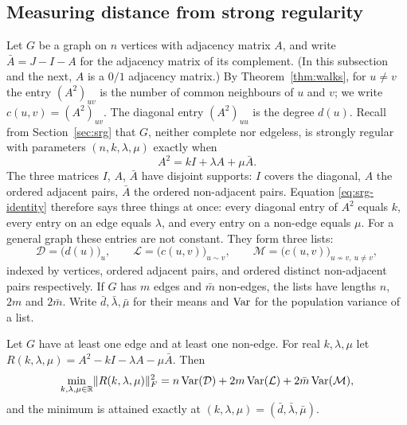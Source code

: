 \subsection{Measuring distance from strong regularity}
\label{subsec:delta}

Let $G$ be a graph on $n$ vertices with adjacency matrix $A$, and write
$\bar A=J-I-A$ for the adjacency matrix of its complement. (In this subsection
and the next, $A$ is a $0/1$ adjacency matrix.) By Theorem~\ref{thm:walks},
for $u\ne v$ the entry $(A^2)_{uv}$ is the number of common neighbours of $u$
and $v$; we write $c(u,v)=(A^2)_{uv}$. The diagonal entry $(A^2)_{uu}$ is the
degree $d(u)$. Recall from Section~\ref{sec:srg} that $G$, neither complete nor
edgeless, is strongly regular with parameters $(n,k,\lambda,\mu)$ exactly when
\begin{equation}\label{eq:srg-identity}
  A^2=kI+\lambda A+\mu\bar A .
\end{equation}
The three matrices $I$, $A$, $\bar A$ have disjoint supports: $I$ covers the
diagonal, $A$ the ordered adjacent pairs, $\bar A$ the ordered non-adjacent
pairs. Equation \eqref{eq:srg-identity} therefore says three things at once:
every diagonal entry of $A^2$ equals $k$, every entry on an edge equals
$\lambda$, and every entry on a non-edge equals $\mu$. For a general graph
these entries are not constant. They form three lists:
\begin{equation}\label{eq:three-lists}
  \mathcal D=\bigl(d(u)\bigr)_{u},\qquad
  \mathcal L=\bigl(c(u,v)\bigr)_{u\sim v},\qquad
  \mathcal M=\bigl(c(u,v)\bigr)_{u\not\sim v,\,u\ne v},
\end{equation}
indexed by vertices, ordered adjacent pairs, and ordered distinct non-adjacent
pairs respectively. If $G$ has $m$ edges and $\bar m$ non-edges, the lists have
lengths $n$, $2m$ and $2\bar m$. Write $\bar d,\bar\lambda,\bar\mu$ for their
means and $\operatorname{Var}$ for the population variance of a list.

\begin{proposition}\label{prop:residual}
Let $G$ have at least one edge and at least one non-edge. For real
$k,\lambda,\mu$ let $R(k,\lambda,\mu)=A^2-kI-\lambda A-\mu\bar A$. Then
\begin{equation}\label{eq:residual}
  \min_{k,\lambda,\mu\in\mathbb{R}}\lVert R(k,\lambda,\mu)\rVert_F^2
  = n\operatorname{Var}(\mathcal D)+2m\operatorname{Var}(\mathcal L)+2\bar m\operatorname{Var}(\mathcal M),
\end{equation}
and the minimum is attained exactly at $(k,\lambda,\mu)=(\bar d,\bar\lambda,\bar\mu)$.
\end{proposition}

